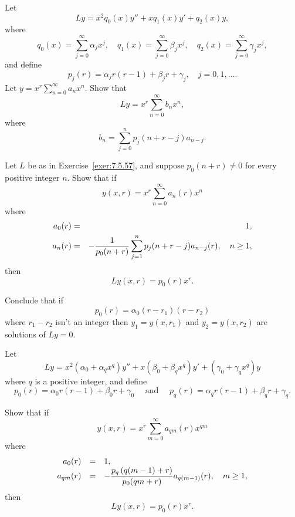 \begin{exerciselist}
  \item\label{exer:7.5.57} Let
  \[
    Ly=x^{2}q_{0}(x)y''+xq_{1}(x)y'+q_{2}(x)y,
  \]
  where
  \[
    q_{0}(x)=\sum_{j=0}^{\infty}\alpha_{j}x^{j},\quad q_{1}(x)=\sum_{j=0}^{\infty}\beta_{j}x^{j},\quad q_{2}(x)=\sum_{j=0}^{\infty}\gamma_{j}x^{j},
  \]
  and define
  \[
    p_{j}(r)=\alpha_{j}r(r-1)+\beta_{j}r+\gamma_{j},\quad j=0,1,\dots.
  \]
  Let $y=x^{r}\sum_{n=0}^{\infty}a_{n}x^{n}$. Show that
  \[
    Ly=x^{r}\sum_{n=0}^{\infty}b_{n}x^{n},
  \]
  where
  \[
    b_{n}=\sum_{j=0}^{n}p_{j}(n+r-j)a_{n-j}.
  \]

  \item\label{exer:7.5.58}
  \begin{alist}
    \item %
    Let $L$ be as in Exercise~\ref{exer:7.5.57}, and suppose $p_{0}(n+r)\ne0$ for every positive
    integer $n$. Show that if
    \[
      y(x,r)=x^{r}\sum_{n=0}^{\infty}a_{n}(r)x^{n}
    \]
    where
    \begin{eqnarray*}
      a_{0}(r) & = & 1, \\
      a_{n}(r) & = & -\displaystyle\frac{1}{p_{0}(n+r)}\sum_{j=1}^{n}p_{j}(n+r-j)a_{n-j}(r),\quad n\ge1,
    \end{eqnarray*}
    then
    \[
      Ly(x,r)=p_{0}(r)x^{r}.
    \]

    \item %
    Conclude that if
    \[
      p_{0}(r)=\alpha_{0}(r-r_{1})(r-r_{2})
    \]
    where $r_{1}-r_{2}$ isn't an integer then $y_{1}=y(x,r_{1})$ and $y_{2}=y(x,r_{2})$ are
    solutions of $Ly=0$.
  \end{alist}

  \item\label{exer:7.5.59} Let
  \[
    Ly=x^{2}(\alpha_{0}+\alpha_{q}x^{q})y''+x(\beta_{0}+\beta_{q}x^{q})y'+ (\gamma_{0}+\gamma_{q}x^{q})y
  \]
  where $q$ is a positive integer, and define
  \[
    p_{0}(r)=\alpha_{0}r(r-1)+\beta_{0}r+\gamma_{0}\quad\mbox{ and }\quad p_{q}(r)=\alpha_{q}r(r-1)+\beta_{q}r+\gamma_{q}.
  \]
  \begin{alist}
    \item %
    Show that if
    \[
      y(x,r)=x^{r}\sum_{m=0}^{\infty}a_{qm}(r)x^{qm}
    \]
    where
    \setcounter{equation}{0}
    \begin{equation}
      \label{eq:7.5.{exer:7.5.59}A}
      \begin{array}{rcl}
        a_{0}(r)  & = & 1,                                                                            \\
        a_{qm}(r) & = & -\dst\frac{p_{q}\left(q(m-1)+r\right)}{p_{0}(qm+r)}a_{q(m-1)}(r),\quad m\ge1,
      \end{array}
    \end{equation}
    then
    \[
      Ly(x,r)=p_{0}(r)x^{r}.
    \]


\end{alist}
\end{exerciselist}
